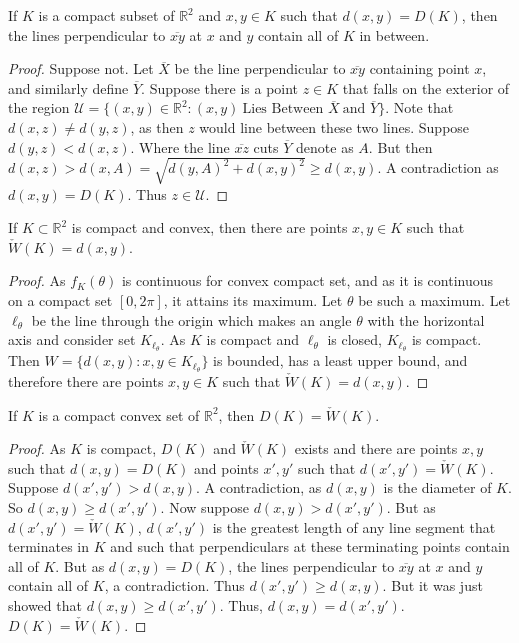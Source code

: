 \documentclass[crop=false,class=book]{standalone}
\begin{document}
\begin{lemma}
If $K$ is a compact subset of $\mathbb{R}^2$ and $x,y\in K$ such that $d(x,y)=D(K)$, then the lines perpendicular to $\overline{xy}$ at $x$ and $y$ contain all of $K$ in between.
\end{lemma}
\begin{proof}
Suppose not. Let $\overline{X}$ be the line perpendicular to $\overline{xy}$ containing point $x$, and similarly define $\overline{Y}$. Suppose there is a point $z\in K$ that falls on the exterior of the region $\mathcal{U} = \{(x,y)\in \mathbb{R}^2: (x,y)\ \textrm{Lies Between } \overline{X}\ \textrm{and } \overline{Y}\}$. Note that $d(x,z)\ne d(y,z)$, as then $z$ would line between these two lines. Suppose $d(y,z)<d(x,z)$. Where the line $\overline{xz}$ cuts $\overline{Y}$ denote as $A$. But then $d(x,z) > d(x,A) = \sqrt{d(y,A)^2+d(x,y)^2}\geq d(x,y)$. A contradiction as $d(x,y) = D(K)$. Thus $z\in \mathcal{U}$.
\end{proof}
\begin{theorem}
If $K\subset \mathbb{R}^2$ is compact and convex, then there are points $x,y\in K$ such that $\check{W}(K)=d(x,y)$.
\end{theorem}
\begin{proof}
As $f_K(\theta)$ is continuous for convex compact set, and as it is continuous on a compact set $[0,2\pi]$, it attains its maximum. Let $\theta$ be such a maximum. Let $\ell_{\theta}$ be the line through the origin which makes an angle $\theta$ with the horizontal axis and consider set $K_{\ell_{\theta}}$. As $K$ is compact and $\ell_{\theta}$ is closed, $K_{\ell_{\theta}}$ is compact. Then $W=\{d(x,y):x,y\in K_{\ell_{\theta}}\}$ is bounded, has a least upper bound, and therefore there are points $x,y \in K$ such that $\check{W}(K)=d(x,y)$.
\end{proof}
\begin{theorem}
If $K$ is a compact convex set of $\mathbb{R}^2$, then $D(K) = \check{W}(K)$.
\end{theorem}
\begin{proof}
As $K$ is compact, $D(K)$ and $\check{W}(K)$ exists and there are points $x,y$ such that $d(x,y) = D(K)$ and points $x',y'$ such that $d(x',y') = \check{W}(K)$. Suppose $d(x',y')> d(x,y)$. A contradiction, as $d(x,y)$ is the diameter of $K$. So $d(x,y) \geq d(x',y')$. Now suppose $d(x,y)>d(x',y')$. But as $d(x',y')= \check{W}(K)$, $d(x',y')$ is the greatest length of any line segment that terminates in $K$ and such that perpendiculars at these terminating points contain all of $K$. But as $d(x,y)=D(K)$, the lines perpendicular to $\overline{xy}$ at $x$ and $y$ contain all of $K$, a contradiction. Thus $d(x',y') \geq d(x,y)$. But it was just showed that $d(x,y)\geq d(x',y')$. Thus, $d(x,y) = d(x',y')$. $D(K) = \check{W}(K)$.
\end{proof}
\end{document}
